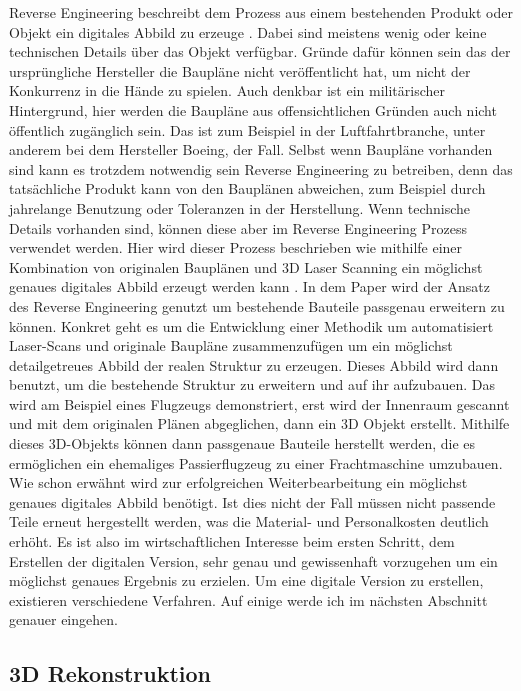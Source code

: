 \documentclass[../main.tex]{subfiles}
\begin{document}
Reverse Engineering beschreibt dem Prozess aus einem bestehenden Produkt 
oder Objekt ein digitales Abbild zu erzeuge \cite{Helle.2021}.
Dabei sind meistens wenig oder keine technischen Details über das Objekt
verfügbar. Gründe dafür können sein das der ursprüngliche Hersteller die 
Baupläne nicht veröffentlicht hat, um nicht der Konkurrenz in die Hände
zu spielen. Auch denkbar ist ein militärischer Hintergrund, hier werden
die Baupläne aus offensichtlichen Gründen auch nicht öffentlich zugänglich
sein. Das ist zum Beispiel in der Luftfahrtbranche, unter anderem bei dem
Hersteller Boeing, der Fall. 
Selbst wenn Baupläne vorhanden sind kann es trotzdem notwendig sein 
Reverse Engineering zu betreiben, denn das tatsächliche Produkt kann von
den Bauplänen abweichen, zum Beispiel durch jahrelange Benutzung oder
Toleranzen in der Herstellung. Wenn technische Details vorhanden sind,
können diese aber im Reverse Engineering Prozess verwendet werden.
Hier wird dieser Prozess beschrieben wie mithilfe einer Kombination von
originalen Bauplänen und 3D Laser Scanning ein möglichst genaues digitales
Abbild erzeugt werden kann \cite{Monchinger.2021}.
In dem Paper wird der Ansatz des Reverse Engineering genutzt um
bestehende Bauteile passgenau erweitern zu können. Konkret geht es um die
Entwicklung einer Methodik um automatisiert Laser-Scans und originale Baupläne
zusammenzufügen um ein möglichst detailgetreues Abbild der realen Struktur zu
erzeugen. Dieses Abbild wird dann benutzt, um die bestehende Struktur zu 
erweitern und auf ihr aufzubauen. Das wird am Beispiel eines Flugzeugs 
demonstriert, erst wird der Innenraum gescannt und mit dem originalen Plänen
abgeglichen, dann ein 3D Objekt erstellt. Mithilfe dieses 3D-Objekts können 
dann passgenaue Bauteile herstellt werden, die es ermöglichen ein ehemaliges 
Passierflugzeug zu einer Frachtmaschine umzubauen.
Wie schon erwähnt wird zur erfolgreichen Weiterbearbeitung ein möglichst 
genaues digitales Abbild benötigt.
Ist dies nicht der Fall müssen nicht passende Teile erneut hergestellt werden, 
was die Material- und Personalkosten deutlich erhöht. Es ist also im 
wirtschaftlichen Interesse beim ersten Schritt, dem Erstellen der digitalen 
Version, sehr genau und gewissenhaft vorzugehen um ein möglichst genaues Ergebnis
zu erzielen. Um eine digitale Version zu erstellen, existieren verschiedene Verfahren.
Auf einige werde ich im nächsten Abschnitt genauer eingehen.


\subsection{3D Rekonstruktion}
\end{document}

